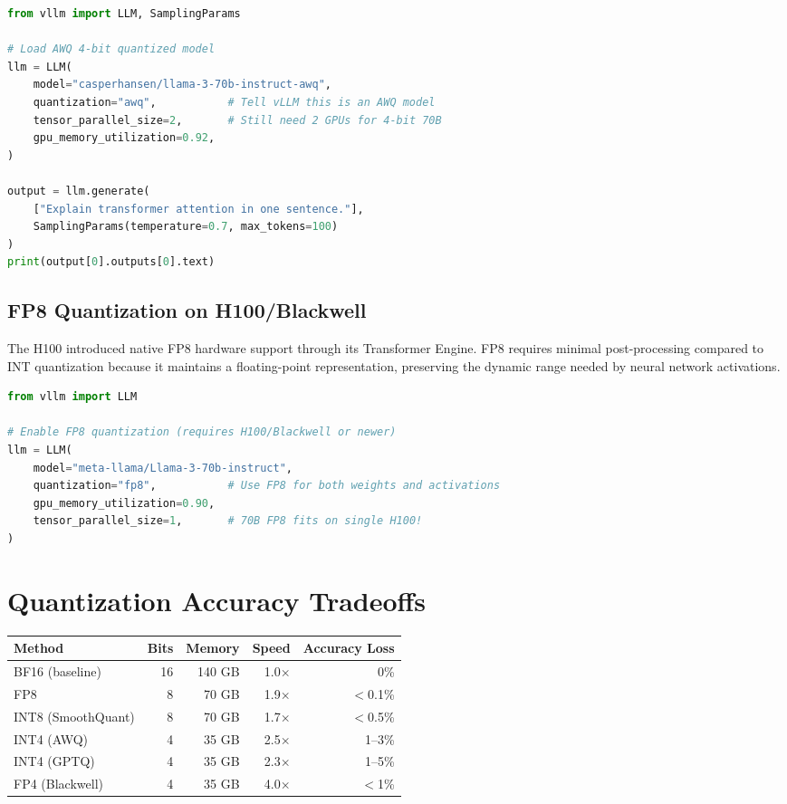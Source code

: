 \documentclass[10pt, oneside, openany]{book}
\begin{document}
\begin{lstlisting}[language=Python, caption={Using vLLM with AWQ quantized model}]
from vllm import LLM, SamplingParams

# Load AWQ 4-bit quantized model
llm = LLM(
    model="casperhansen/llama-3-70b-instruct-awq",
    quantization="awq",           # Tell vLLM this is an AWQ model
    tensor_parallel_size=2,       # Still need 2 GPUs for 4-bit 70B
    gpu_memory_utilization=0.92,
)

output = llm.generate(
    ["Explain transformer attention in one sentence."],
    SamplingParams(temperature=0.7, max_tokens=100)
)
print(output[0].outputs[0].text)
\end{lstlisting}

\subsection{FP8 Quantization on H100/Blackwell}

The H100 introduced native FP8 hardware support through its Transformer Engine.
FP8 requires minimal post-processing compared to INT quantization because it
maintains a floating-point representation, preserving the dynamic range needed
by neural network activations.

\begin{lstlisting}[language=Python, caption={FP8 inference with vLLM}]
from vllm import LLM

# Enable FP8 quantization (requires H100/Blackwell or newer)
llm = LLM(
    model="meta-llama/Llama-3-70b-instruct",
    quantization="fp8",           # Use FP8 for both weights and activations
    gpu_memory_utilization=0.90,
    tensor_parallel_size=1,       # 70B FP8 fits on single H100!
)
\end{lstlisting}

\section{Quantization Accuracy Tradeoffs}

\begin{center}
\begin{tabular}{lrrrr}
  \toprule
  \textbf{Method} & \textbf{Bits} & \textbf{Memory} & \textbf{Speed} &
  \textbf{Accuracy Loss} \\
  \midrule
  BF16 (baseline) & 16 & 140 GB & 1.0$\times$ & 0\% \\
  FP8 & 8 & 70 GB & 1.9$\times$ & $<$0.1\% \\
  INT8 (SmoothQuant) & 8 & 70 GB & 1.7$\times$ & $<$0.5\% \\
  INT4 (AWQ) & 4 & 35 GB & 2.5$\times$ & 1--3\% \\
  INT4 (GPTQ) & 4 & 35 GB & 2.3$\times$ & 1--5\% \\
  FP4 (Blackwell) & 4 & 35 GB & 4.0$\times$ & $<$1\% \\
  \bottomrule
\end{tabular}
\end{center}
\end{document}
